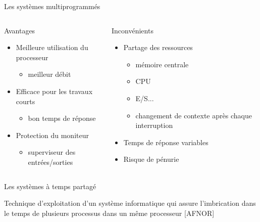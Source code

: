 \begin{frame}{Les systèmes multiprogrammés}
\begin{columns}
\begin{block}{Avantages}
\begin{itemize}
\item Meilleure utilisation du processeur
\begin{itemize}
\item meilleur débit
\end{itemize}
\item Efficace pour les travaux courts \begin{itemize}\item bon temps de réponse \end{itemize}
\item Protection du moniteur
\begin{itemize}
\item superviseur des entrées/sorties
\end{itemize}
\end{itemize}
\end{block}
\begin{block}{Inconvénients}
\begin{itemize}
\item Partage des ressources
\begin{itemize}
\item mémoire centrale
\item CPU
\item E/S...
\item changement de contexte après chaque interruption
\end{itemize}
\item Temps de réponse variables
\item Risque de pénurie
\end{itemize}
\end{block}
\end{columns}
\end{frame}


\begin{frame}{Les systèmes à temps partagé}
\begin{definition}
Technique d’exploitation d’un système informatique qui assure l’imbrication dans le temps
de plusieurs processus dans un même processeur [AFNOR]
\end{definition}
\end{frame}

